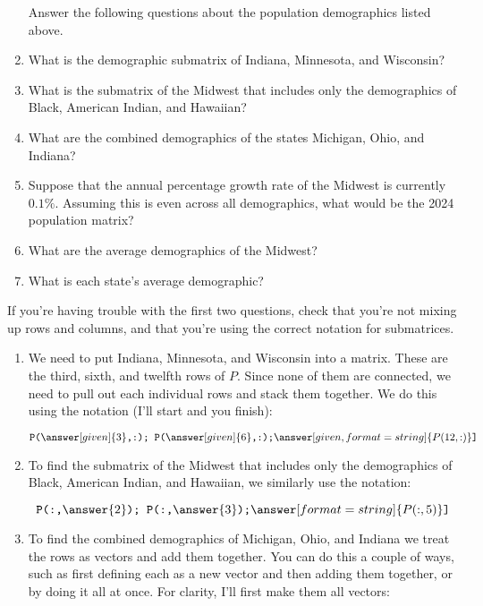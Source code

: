 \documentclass{ximera}
\begin{document}
  \begin{example}


\begin{enumerate}

  Answer the following questions about the population demographics listed above.

\item What is the demographic submatrix of Indiana, Minnesota, and Wisconsin?
\item What is the submatrix of the Midwest that includes only the
  demographics of Black, American Indian, and Hawaiian?
\item What are the combined demographics of the states Michigan, Ohio,
  and Indiana?
\item Suppose that the annual percentage growth rate of the Midwest is
  currently $0.1\%$. Assuming this is even across all demographics,
  what would be the 2024 population matrix?
\item What are the average demographics of the Midwest?
\item What is each state's average demographic? 
\end{enumerate}

\begin{hint}

  If you're having trouble with the first two questions, check that you're not mixing up rows and columns, and that you're using the correct notation for submatrices.

\end{hint}

\begin{solution}
  \begin{enumerate}
  \item We need to put Indiana, Minnesota, and Wisconsin into a matrix. These are the third, sixth, and twelfth rows of $P$. Since none of them are connected, we need to pull out each individual rows and stack them together. We do this using the notation (I'll start and you finish):

    \[
    \texttt{P(}\answer[given]{3}\texttt{,:); P(}\answer[given]{6}\texttt{,:);}\answer[given,format=string]{P(12,:)}\texttt{]} 
    \]
    \item To find the submatrix of the Midwest that includes only the
      demographics of Black, American Indian, and Hawaiian, we similarly use the notation:

      \[
      \texttt{P(:,}\answer{2}\texttt{); P(:,}\answer{3}\texttt{);}\answer[format=string]{P(:,5)}\texttt{]}
      \]
  \item To find the combined demographics of Michigan, Ohio, and
    Indiana we treat the rows as vectors and add them together. You can do this a couple of ways, such as first defining each as a new vector and then adding them together, or by doing it all at once. For clarity, I'll first make them all vectors:


\end{enumerate}
\end{solution}
\end{example}
\end{document}
